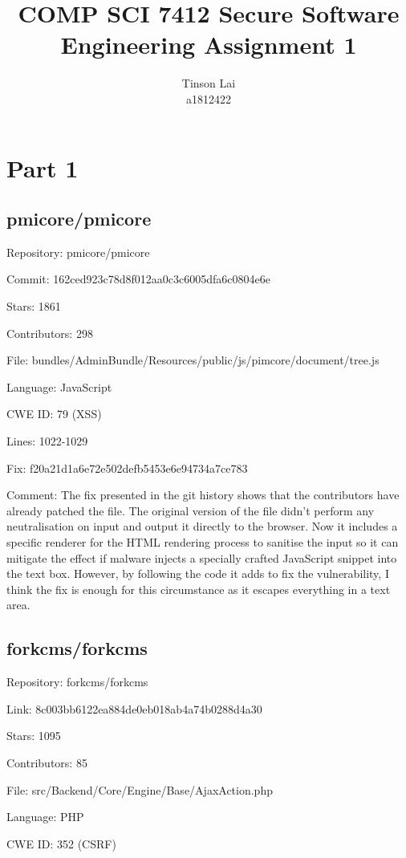 \documentclass[12pt]{article}
\title{COMP SCI 7412 Secure Software Engineering Assignment 1}
\author{Tinson Lai \\ a1812422}
\date{}
\begin{document}
\maketitle

\section{Part 1}

\subsection{pmicore/pmicore}

Repository: pmicore/pmicore

Commit: 162ced923c78d8f012aa0c3c6005dfa6c0804e6e

Stars: 1861

Contributors: 298

File: bundles/AdminBundle/Resources/public/js/pimcore/document/tree.js

Language: JavaScript

CWE ID: 79 (XSS)

Lines: 1022-1029

Fix: f20a21d1a6e72e502defb5453e6e94734a7ce783

Comment: The fix presented in the git history shows that the contributors have already patched the file.  The original version of the file didn't perform any neutralisation on input and output it directly to the browser. Now it includes a specific renderer for the HTML rendering process to sanitise the input so it can mitigate the effect if malware injects a specially crafted JavaScript snippet into the text box. However, by following the code it adds to fix the vulnerability, I think the fix is enough for this circumstance as it escapes everything in a text area.

\subsection{forkcms/forkcms}

Repository: forkcms/forkcms

Link: 8c003bb6122ea884de0eb018ab4a74b0288d4a30

Stars: 1095

Contributors: 85

File: src/Backend/Core/Engine/Base/AjaxAction.php

Language: PHP

CWE ID: 352 (CSRF)
\end{document}
